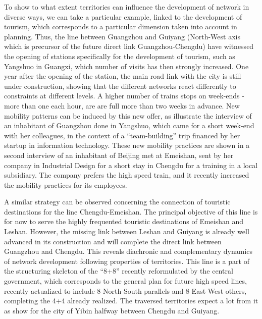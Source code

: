 \documentclass[11pt]{article}
\begin{document}
To show to what extent territories can influence the development of network in diverse ways, we can take a particular example, linked to the development of tourism, which corresponds to a particular dimension taken into account in planning. Thus, the line between Guangzhou and Guiyang (North-West axis which is precursor of the future direct link Guangzhou-Chengdu) have witnessed the opening of stations specifically for the development of tourism, such as Yangshuo in Guangxi, which number of visits has then strongly increased. One year after the opening of the station, the main road link with the city is still under construction, showing that the different networks react differently to constraints at different levels. A higher number of trains stops on week-ends - more than one each hour, are are full more than two weeks in advance. New mobility patterns can be induced by this new offer, as illustrate the interview of an inhabitant of Guangzhou done in Yangshuo, which came for a short week-end with her colleagues, in the context of a ``team-building'' trip financed by her startup in information technology. These new mobility practices are shown in a second interview of an inhabitant of Beijing met at Emeishan, sent by her company in Industrial Design for a short stay in Chengdu for a training in a local subsidiary. The company prefers the high speed train, and it recently increased the mobility practices for its employees.

A similar strategy can be observed concerning the connection of touristic destinations for the line Chengdu-Emeishan. The principal objective of this line is for now to serve the highly frequented touristic destinations of Emeishan and Leshan. However, the missing link between Leshan and Guiyang is already well advanced in its construction and will complete the direct link between Guangzhou and Chengdu. This reveals diachronic and complementary dynamics of network development following properties of territories. This line is a part of the structuring skeleton of the ``8+8'' recently reformulated by the central government, which corresponds to the general plan for future high speed lines, recently actualized to include 8 North-South parallels and 8 East-West others, completing the 4+4 already realized.  The traversed territories expect a lot from it as show \cite{lu2012chengdu} for the city of Yibin halfway between Chengdu and Guiyang.
\end{document}

